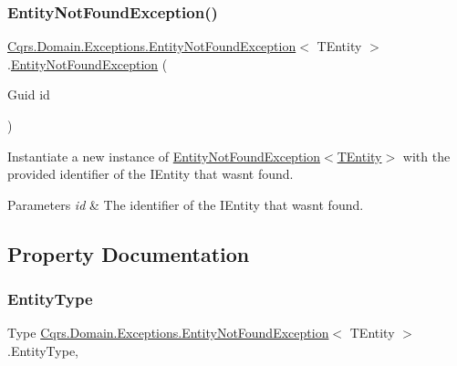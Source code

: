 \subsubsection{\texorpdfstring{Entity\+Not\+Found\+Exception()}{EntityNotFoundException()}}
{\footnotesize\ttfamily \hyperlink{classCqrs_1_1Domain_1_1Exceptions_1_1EntityNotFoundException}{Cqrs.\+Domain.\+Exceptions.\+Entity\+Not\+Found\+Exception}$<$ T\+Entity $>$.\hyperlink{classCqrs_1_1Domain_1_1Exceptions_1_1EntityNotFoundException}{Entity\+Not\+Found\+Exception} (\begin{DoxyParamCaption}\item[{Guid}]{id }\end{DoxyParamCaption})}



Instantiate a new instance of \hyperlink{classCqrs_1_1Domain_1_1Exceptions_1_1EntityNotFoundException_ab62ed57aa319b92b5aebe6b34c69b177_ab62ed57aa319b92b5aebe6b34c69b177}{Entity\+Not\+Found\+Exception$<$\+T\+Entity$>$} with the provided identifier of the I\+Entity that wasn\textquotesingle{}t found. 


\begin{DoxyParams}{Parameters}
{\em id} & The identifier of the I\+Entity that wasn\textquotesingle{}t found.\\
\hline
\end{DoxyParams}


\subsection{Property Documentation}
\mbox{\label{classCqrs_1_1Domain_1_1Exceptions_1_1EntityNotFoundException_aa3af9a584f16af89e989d86c62a26877_aa3af9a584f16af89e989d86c62a26877}} 
\subsubsection{\texorpdfstring{Entity\+Type}{EntityType}}
{\footnotesize\ttfamily Type \hyperlink{classCqrs_1_1Domain_1_1Exceptions_1_1EntityNotFoundException}{Cqrs.\+Domain.\+Exceptions.\+Entity\+Not\+Found\+Exception}$<$ T\+Entity $>$.Entity\+Type\hspace{0.3cm}{\ttfamily [get]}, {\ttfamily [set]}}



